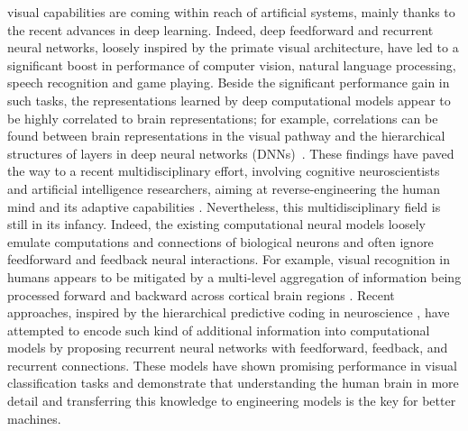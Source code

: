 \documentclass[10pt,journal,compsoc,twocolumn]{IEEEtran}
\begin{document}
\maketitle

\IEEEdisplaynontitleabstractindextext

\IEEEpeerreviewmaketitle

 visual capabilities are coming within reach of artificial systems, mainly thanks to the  recent advances in deep learning. Indeed, deep feedforward and recurrent neural networks, loosely inspired by the primate visual architecture, have led to a significant boost in performance of computer vision, natural language processing, speech recognition and game playing. Beside the significant performance gain in such tasks, the representations learned by deep computational models appear to be highly correlated to brain representations; for example, correlations can be found between brain representations in the visual pathway and the hierarchical structures of layers in deep neural networks (DNNs)~\cite{pmid28530228,pmid27282108}. 
These findings have paved the way to a recent multidisciplinary effort, involving cognitive neuroscientists and artificial intelligence researchers, aiming at reverse-engineering the human mind and its adaptive capabilities \cite{Spampinato2016deep, 8237631,pmid21945275,pmid23932491}. 
Nevertheless, this multidisciplinary  field is still in its infancy. Indeed, the existing computational neural models loosely emulate computations and connections of biological neurons and often ignore feedforward and feedback neural interactions. For example, visual recognition in humans appears to be mitigated by a multi-level aggregation of information being processed forward and backward across cortical brain regions \cite{pmid11690606,pmid21438683,pmid21415848,pmid22325196}. Recent approaches\cite{pmlr-v80-wen18a}, inspired by the  hierarchical predictive coding in neuroscience \cite{pmid23663408,pmid23177956}, have attempted to encode such kind of additional information into computational models by proposing recurrent neural networks with feedforward, feedback, and recurrent connections. These models have shown promising performance in visual classification tasks and demonstrate that understanding the human brain in more detail and transferring this knowledge to engineering models is the key for better machines. 
\end{document}
